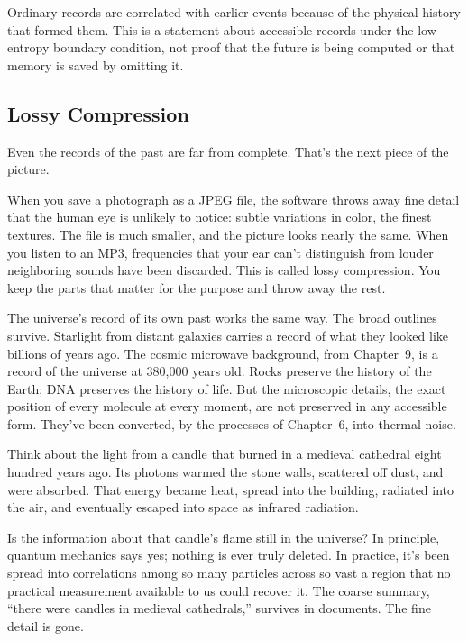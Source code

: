 Ordinary records are correlated with earlier events because of the physical history that formed them. This is a statement about accessible records under the low-entropy boundary condition, not proof that the future is being computed or that memory is saved by omitting it.

\subsection{Lossy Compression}

Even the records of the past are far from complete. That's the next piece of the picture.

When you save a photograph as a JPEG file, the software throws away fine detail that the human eye is unlikely to notice: subtle variations in color, the finest textures. The file is much smaller, and the picture looks nearly the same. When you listen to an MP3, frequencies that your ear can't distinguish from louder neighboring sounds have been discarded. This is called lossy compression. You keep the parts that matter for the purpose and throw away the rest.

The universe's record of its own past works the same way. The broad outlines survive. Starlight from distant galaxies carries a record of what they looked like billions of years ago. The cosmic microwave background, from Chapter~9, is a record of the universe at 380,000 years old. Rocks preserve the history of the Earth; DNA preserves the history of life. But the microscopic details, the exact position of every molecule at every moment, are not preserved in any accessible form. They've been converted, by the processes of Chapter~6, into thermal noise.

\begin{examplebox}
Think about the light from a candle that burned in a medieval cathedral eight hundred years ago. Its photons warmed the stone walls, scattered off dust, and were absorbed. That energy became heat, spread into the building, radiated into the air, and eventually escaped into space as infrared radiation.

Is the information about that candle's flame still in the universe? In principle, quantum mechanics says yes; nothing is ever truly deleted. In practice, it's been spread into correlations among so many particles across so vast a region that no practical measurement available to us could recover it. The coarse summary, ``there were candles in medieval cathedrals,'' survives in documents. The fine detail is gone.
\end{examplebox}

